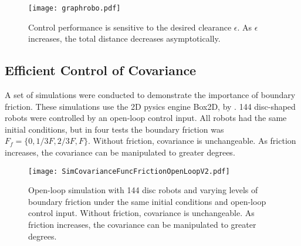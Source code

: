 \begin{figure}
\begin{center}
	\texttt{[image: graphrobo.pdf]}
\end{center}
\caption{\label{fig:graphrobo.pdf}
Control performance is sensitive to the desired clearance $\epsilon$.  As $\epsilon$ increases, the total distance decreases asymptotically.
}
\end{figure}

\subsection{Efficient Control of Covariance}
A set of simulations were conducted to demonstrate the importance of boundary friction.  These simulations use  the 2D pysics engine Box2D, by \citet{catto2010box2d}.
 144 disc-shaped robots were controlled by an open-loop control input.  All robots had  the same initial conditions, but in four tests the boundary friction was $F_f = \{0,1/3 F, 2/3F, F\}$.
 Without friction, covariance is unchangeable.  As friction increases, the covariance can be manipulated to greater degrees.


\begin{figure}
\begin{center}
	\texttt{[image: SimCovarianceFuncFrictionOpenLoopV2.pdf]}
\end{center}
\caption{\label{fig:SimCovarianceFuncFrictionOpenLoop}
Open-loop simulation with 144 disc robots and varying levels of boundary friction under the same initial conditions and open-loop control input.  Without friction, covariance is unchangeable.  As friction increases, the covariance can be manipulated to greater degrees.
}
\end{figure}




